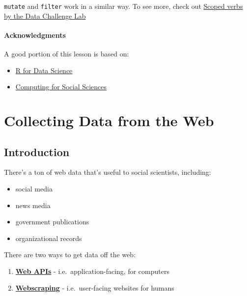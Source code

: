 \documentclass[]{book}
\providecommand{\tightlist}{%
  \setlength{\itemsep}{0pt}\setlength{\parskip}{0pt}}
\begin{document}
\texttt{mutate} and \texttt{filter} work in a similar way. To see more,
check out
\href{https://dcl-2017-04.github.io/curriculum/manip-scoped.html}{Scoped
verbs by the Data Challenge Lab}

\subsubsection*{Acknowledgments}\label{acknowledgments-6}

A good portion of this lesson is based on:

\begin{itemize}
\tightlist
\item
  \href{https://r4ds.had.co.nz/iteration.html}{R for Data Science}
\item
  \href{https://cfss.uchicago.edu/notes/iteration/}{Computing for Social
  Sciences}
\end{itemize}

\chapter{Collecting Data from the
Web}\label{collecting-data-from-the-web}

\section{Introduction}\label{introduction-2}

There's a ton of web data that's useful to social scientists, including:

\begin{itemize}
\tightlist
\item
  social media
\item
  news media
\item
  government publications
\item
  organizational records
\end{itemize}

There are two ways to get data off the web:

\begin{enumerate}
\def\labelenumi{\arabic{enumi}.}
\tightlist
\item
  \textbf{\protect\hyperlink{web-apis}{Web APIs}} -
  i.e.~application-facing, for computers
\item
  \textbf{\protect\hyperlink{webscraping}{Webscraping}} -
  i.e.~user-facing websites for humans
\end{enumerate}
\end{document}
